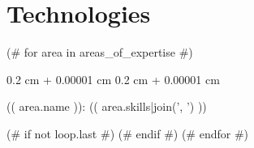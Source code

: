 \documentclass[10pt, letterpaper]{article}
\newenvironment{onecolentry}{
    \begin{adjustwidth}{
        0.2 cm + 0.00001 cm
    }{
        0.2 cm + 0.00001 cm
    }
}{
    \end{adjustwidth}
} %
\begin{document}
    \section{Technologies}


        (# for area in areas_of_expertise #)
        \begin{onecolentry}
                (( area.name )): (( area.skills|join(', ') ))
        \end{onecolentry}
            (# if not loop.last #)
                \vspace{0.2 cm}
            (# endif #)
        (# endfor #)
\end{document}
